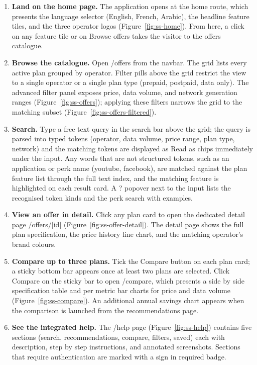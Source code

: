 \begin{enumerate}
  \item \textbf{Land on the home page.} The application opens at the home route, which presents the language selector (English, French, Arabic), the headline feature tiles, and the three operator logos (Figure~\ref{fig:ss-home}). From here, a click on any feature tile or on \guillemotleft{}Browse offers\guillemotright{} takes the visitor to the offers catalogue.
  \item \textbf{Browse the catalogue.} Open /offers from the navbar. The grid lists every active plan grouped by operator. Filter pills above the grid restrict the view to a single operator or a single plan type (prepaid, postpaid, data only). The advanced filter panel exposes price, data volume, and network generation ranges (Figure~\ref{fig:ss-offers}); applying these filters narrows the grid to the matching subset (Figure~\ref{fig:ss-offers-filtered}).
  \item \textbf{Search.} Type a free text query in the search bar above the grid; the query is parsed into typed tokens (operator, data volume, price range, plan type, network) and the matching tokens are displayed as \guillemotleft{}Read as\guillemotright{} chips immediately under the input. Any words that are not structured tokens, such as an application or perk name (\guillemotleft{}youtube\guillemotright{}, \guillemotleft{}facebook\guillemotright{}), are matched against the plan feature list through the full text index, and the matching feature is highlighted on each result card. A \guillemotleft{}?\guillemotright{} popover next to the input lists the recognised token kinds and the perk search with examples.
  \item \textbf{View an offer in detail.} Click any plan card to open the dedicated detail page /offers/[id] (Figure~\ref{fig:ss-offer-detail}). The detail page shows the full plan specification, the price history line chart, and the matching operator's brand colours.
  \item \textbf{Compare up to three plans.} Tick the \guillemotleft{}Compare\guillemotright{} button on each plan card; a sticky bottom bar appears once at least two plans are selected. Click \guillemotleft{}Compare\guillemotright{} on the sticky bar to open /compare, which presents a side by side specification table and per metric bar charts for price and data volume (Figure~\ref{fig:ss-compare}). An additional annual savings chart appears when the comparison is launched from the recommendations page.
  \item \textbf{See the integrated help.} The /help page (Figure~\ref{fig:ss-help}) contains five sections (search, recommendations, compare, filters, saved) each with description, step by step instructions, and annotated screenshots. Sections that require authentication are marked with a \guillemotleft{}sign in required\guillemotright{} badge.
\end{enumerate}

